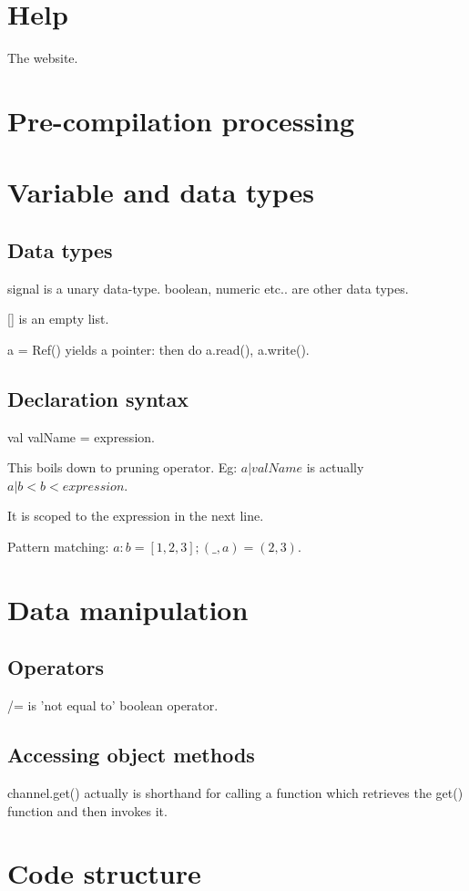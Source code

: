 \documentclass[oneside, article]{memoir}
\begin{document}
\section{Help}
The website.

\section{Pre-compilation processing}

\section{Variable and data types}
\subsection{Data types}
signal is a unary data-type. boolean, numeric etc.. are other data types.

[] is an empty list.

a = Ref() yields a pointer: then do a.read(), a.write().

\subsection{Declaration syntax}
val valName = expression.

This boils down to pruning operator. Eg: $a|valName$ is actually $a|b<b<expression$.

It is scoped to the expression in the next line.

Pattern matching: $a:b=[1, 2, 3]; (\_, a) = (2, 3)$.

\section{Data manipulation}
\subsection{Operators}
/= is 'not equal to' boolean operator.

\subsection{Accessing object methods}
channel.get() actually is shorthand for calling a function which retrieves the get() function and then invokes it.

\section{Code structure}
\end{document}

